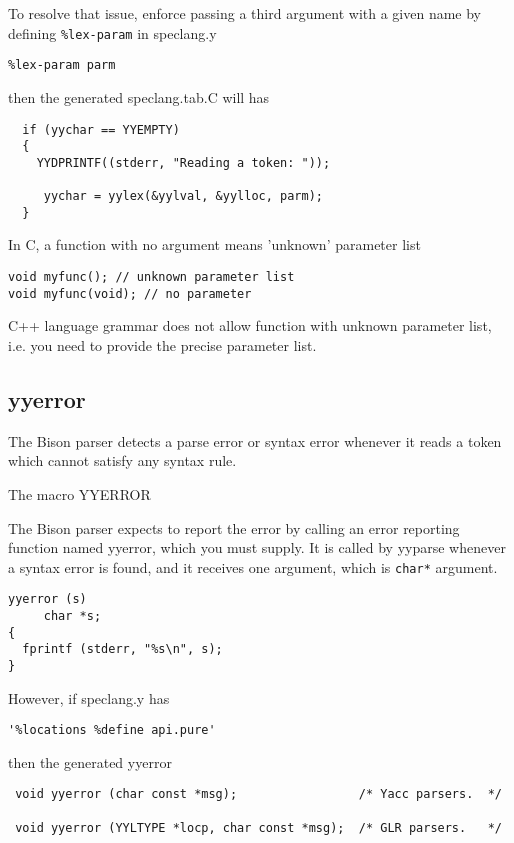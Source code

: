To resolve that issue, enforce passing a third argument with a given name by defining \verb!%lex-param! in speclang.y
\begin{verbatim}
%lex-param parm
\end{verbatim}
then the generated speclang.tab.C will has
\begin{verbatim}
  if (yychar == YYEMPTY)
  {
    YYDPRINTF((stderr, "Reading a token: "));
    
     yychar = yylex(&yylval, &yylloc, parm);
  }
\end{verbatim}


\begin{mdframed}

In C, a function with no argument means 'unknown' parameter list 
\begin{verbatim}
void myfunc(); // unknown parameter list
void myfunc(void); // no parameter
\end{verbatim}

C++ language grammar does not allow function with unknown parameter list, i.e.
you need to provide the precise parameter list.
\end{mdframed}


\subsection{yyerror}
\label{sec:yyerror}

The Bison parser detects a parse error or syntax error whenever it reads a token which cannot satisfy any syntax rule. 

The macro YYERROR 

The Bison parser expects to report the error by calling an error reporting function named yyerror, which you must supply.
It is called by yyparse whenever a syntax error is found, and it receives one argument, which is \verb!char*! argument.

\begin{verbatim}
yyerror (s)
     char *s;
{
  fprintf (stderr, "%s\n", s);
}

\end{verbatim}

However, if speclang.y has
\begin{verbatim}
'%locations %define api.pure' 
\end{verbatim}
then the generated yyerror
\begin{verbatim}
 void yyerror (char const *msg);                 /* Yacc parsers.  */
 
 void yyerror (YYLTYPE *locp, char const *msg);  /* GLR parsers.   */
\end{verbatim}


